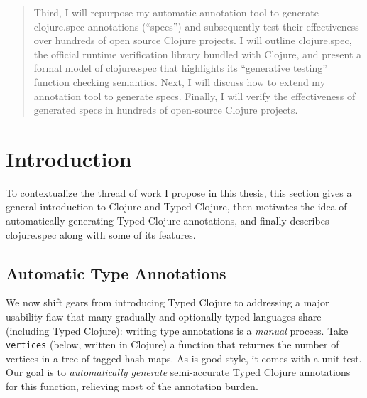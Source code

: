 \documentclass[9pt]{extarticle}
\begin{document}
\begin{abstract}
Third, I will repurpose my automatic annotation tool to generate clojure.spec annotations (``specs'')
and subsequently test their effectiveness over hundreds of open source Clojure projects.
I will outline clojure.spec, the official runtime verification
library bundled with Clojure, and present a formal model of clojure.spec that highlights its
``generative testing'' function checking semantics.
Next, I will discuss how to extend my annotation tool to generate specs.
Finally, I will verify the effectiveness of generated specs in hundreds of open-source Clojure projects.
\end{abstract}

%
%

\section{Introduction}

To contextualize the thread of work I propose in this thesis, this section
gives a general introduction to Clojure and Typed Clojure,
then motivates the idea of automatically generating Typed Clojure annotations,
and finally describes clojure.spec along with some of its features.



\subsection{Automatic Type Annotations}


We now shift gears from introducing Typed Clojure to
addressing a major usability flaw that many
gradually and optionally typed languages share (including Typed Clojure):
writing type annotations is a \emph{manual} process.
%
Take \texttt{vertices} (below, written in Clojure)
a function that returnes the number of vertices
in a tree of tagged hash-maps.
As is good style, it comes with a unit test.
Our goal is to \textit{automatically generate} semi-accurate Typed Clojure %
annotations
for this function, relieving most of the annotation
burden.
\end{document}
